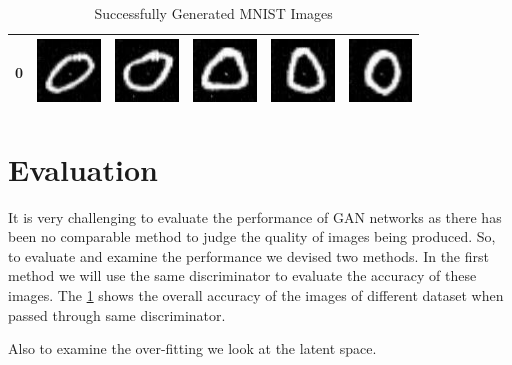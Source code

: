\begin{table}[H]
\begin{tabular}{|llllll|}
\end{tabular}
\end{table}

\begin{table}[ht]
\centering
\caption{Successfully Generated MNIST Images}
\label{MNIST-Result}
\begin{tabular}{|llllll|}
\hline
0 & \includegraphics[width=1.69cm, height=1.69cm]{Files/MNIST/9.9915 [www.imagesplitter.net]-0-0.png}  &\includegraphics[width=1.69cm, height=1.69cm]{Files/MNIST/9.9915 [www.imagesplitter.net]-1-2.png}   & \includegraphics[width=1.69cm, height=1.69cm]{Files/MNIST/9.9915 [www.imagesplitter.net]-2-4.png}  & \includegraphics[width=1.69cm, height=1.69cm]{Files/MNIST/9.9915 [www.imagesplitter.net]-5-0.png}  & \includegraphics[width=1.69cm, height=1.69cm]{Files/MNIST/9.9915 [www.imagesplitter.net]-6-2.png} \\ \hline
\end{tabular}
\end{table}



\section{Evaluation}

It is very challenging to evaluate the performance of GAN networks as there has been no comparable method to judge the quality of images being produced. So, to evaluate and examine the performance we devised two methods. In the first method we will use the same discriminator to evaluate the accuracy of these images. The \cref{} shows the overall accuracy of the images of different dataset when passed through same discriminator.  


Also to examine the over-fitting we look at the latent space. 